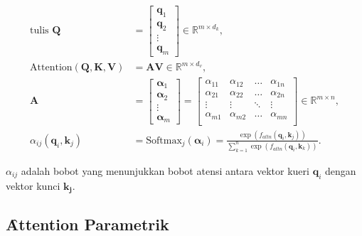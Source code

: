 	\begin{align}
		\label{equ:soft-attention-matrix-start}
		\text{tulis }\mathbf{Q} &= \begin{bmatrix}
			\mathbf{q}_1 \\
			\mathbf{q}_2 \\
			\vdots \\
			\mathbf{q}_m
		\end{bmatrix} \in \mathbb{R}^{m \times d_k}, \\
		\text{Attention}(\mathbf{Q}, \mathbf{K}, \mathbf{V}) &= \mathbf{A} \mathbf{V} \in \mathbb{R}^{m \times d_v},\\
		\mathbf{A} &= \begin{bmatrix}
			\bm{\alpha}_1 \\
			\bm{\alpha}_2 \\
			\vdots \\
			\bm{\alpha}_m
		\end{bmatrix} = \begin{bmatrix}
			\alpha_{11} & \alpha_{12} & \dots & \alpha_{1n} \\
			\alpha_{21} & \alpha_{22} & \dots & \alpha_{2n} \\
			\vdots & \vdots & \ddots & \vdots \\
			\alpha_{m1} & \alpha_{m2} & \dots & \alpha_{mn} \\
		\end{bmatrix} \in \mathbb{R}^{m \times n}, \\
		\label{equ:soft-attention-matrix-end}
		\alpha_{ij}(\mathbf{q}_i, \mathbf{k}_j) &= \text{Softmax}_j(\mathbf{\alpha}_i) = \frac{\exp(f_{attn}(\mathbf{q}_i, \mathbf{k}_j))}{\sum_{k=1}^{n} \exp(f_{attn}(\mathbf{q}_i, \mathbf{k}_k))}.
	\end{align}

	$\alpha_{ij}$ adalah bobot yang menunjukkan bobot atensi antara vektor kueri $\mathbf{q}_i$ dengan vektor kunci $\mathbf{k_j}$. 

	\subsection{\f{Attention} Parametrik}

